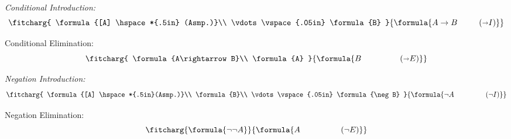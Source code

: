 \documentclass[a4paper, 11pt]{article} %
\begin{document}
\begin{multicols}{2}\it
Conditional Introduction:\vspace{-.05in}
\begin{equation*}
\fitcharg{
\formula{[A] \hspace*{.5in} (Asmp.)}\\
\vdots\vspace{.05in}
\formula{B}
}{
\formula{A\rightarrow B \hspace*{.365in}({\shortrightarrow}I)}
}
\end{equation*}

Conditional Elimination:\vspace{-.05in}
\begin{equation*}
\fitcharg{
\formula{A\rightarrow B}\\
\formula{A}
}{
\formula{B \hspace*{.655in}({\shortrightarrow}E)}
}
\end{equation*}
\end{multicols}
\vspace{-.05in}



\begin{multicols}{2}\it
Negation Introduction:\vspace{-.05in}
\begin{equation*}
\fitcharg{
\formula{[A] \hspace*{.5in}(Asmp.)}\\
\formula{B}\\
\vdots\vspace{.05in}
\formula{\neg B}
}{
\formula{\neg A \hspace*{.617in}(\neg I)}
}
\end{equation*}

Negation Elimination:\vspace{-.05in}
\begin{equation*}
\fitcharg{
\formula{\neg\neg A}
}{
\formula{A \hspace*{.688in}(\neg E)}
}
\end{equation*}
\end{multicols}
\vspace{-.05in}
\end{document}

